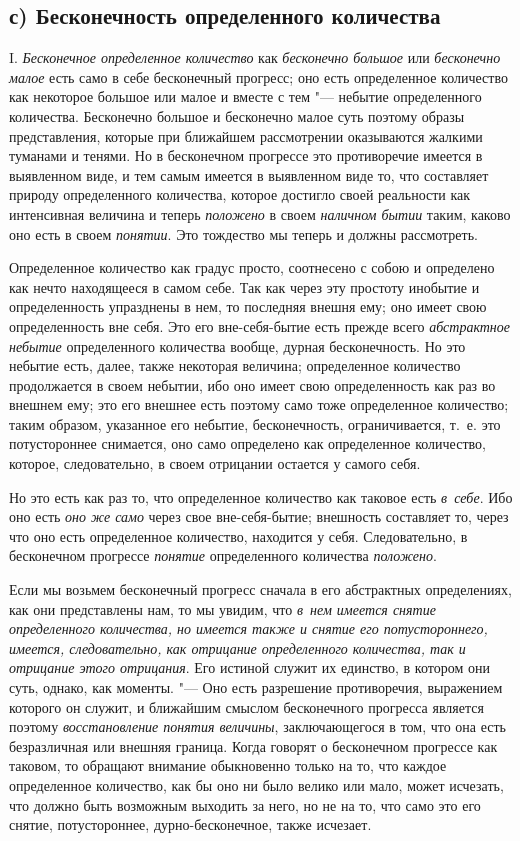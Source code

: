 \subsection[с) Бесконечность определенного количества]%
{с) Бесконечность определенного количества}

I. {\em Бесконечное определенное количество} как {\em бесконечно большое} или
{\em бесконечно малое} есть само в себе бесконечный прогресс; оно есть
определенное количество как некоторое большое или малое и вместе с тем "---
небытие определенного количества. Бесконечно большое и бесконечно малое суть
поэтому образы представления, которые при ближайшем рассмотрении оказываются
жалкими туманами и тенями. Но в бесконечном прогрессе это противоречие имеется
в выявленном виде, и тем самым имеется в выявленном виде то, что составляет
природу определенного количества, которое достигло своей реальности как
интенсивная величина и теперь {\em положено} в своем {\em наличном бытии}
таким, каково оно есть в своем {\em понятии}. Это тождество мы теперь и должны
рассмотреть.

Определенное количество как градус просто, соотнесено с собою и определено как
нечто находящееся в самом себе. Так как через эту простоту инобытие
и определенность упразднены в нем, то последняя внешня ему; оно имеет свою
определенность вне себя. Это его вне-себя-бытие есть прежде всего
{\em абстрактное небытие} определенного количества вообще, дурная
бесконечность. Но это небытие есть, далее, также некоторая величина;
определенное количество продолжается в своем небытии, ибо оно имеет свою
определенность как раз во внешнем ему; это его внешнее есть поэтому само тоже
определенное количество; таким образом, указанное его небытие, бесконечность,
ограничивается, т.~е. это потустороннее снимается, оно само определено как
определенное количество, которое, следовательно, в своем отрицании остается
у самого себя.

Но это есть как раз то, что определенное количество как таковое есть
{\em в~себе}. Ибо оно есть {\em оно же само} через свое вне-себя-бытие;
внешность составляет то, через что оно есть определенное количество, находится
у себя. Следовательно, в бесконечном прогрессе {\em понятие} определенного
количества {\em положено}.

Если мы возьмем бесконечный прогресс сначала в его абстрактных определениях,
как они представлены нам, то мы увидим, что {\em в~нем имеется снятие
определенного количества, но имеется также и снятие его потустороннего,
имеется, следовательно, как отрицание определенного количества, так и отрицание
этого отрицания}. Его истиной служит их единство, в котором они суть, однако,
как моменты. "--- Оно есть разрешение противоречия, выражением которого он
служит, и ближайшим смыслом бесконечного прогресса является поэтому
{\em восстановление понятия величины}, заключающегося в том, что она есть
безразличная или внешняя граница. Когда говорят о бесконечном прогрессе как
таковом, то обращают внимание обыкновенно только на то, что каждое определенное
количество, как бы оно ни было велико или мало, может исчезать, что должно быть
возможным выходить за него, но не на то, что само это его снятие,
потустороннее, дурно-бесконечное, также исчезает.


